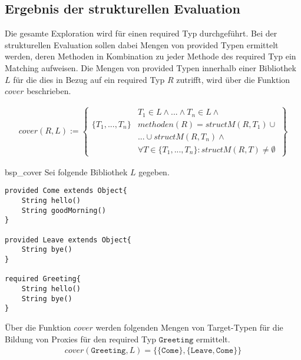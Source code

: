 \subsection{Ergebnis der strukturellen Evaluation}\label{sec_ergStructEval}
Die gesamte Exploration wird für einen required Typ durchgeführt. Bei der strukturellen Evaluation sollen dabei Mengen von provided Typen ermittelt werden, deren Methoden in Kombination zu jeder Methode des required Typ ein Matching aufweisen. Die Mengen von provided Typen innerhalb einer Bibliothek $L$ für die dies in Bezug auf ein required Typ $R$ zutrifft, wird über die Funktion $cover$ beschrieben.

\begin{gather*}
cover(R,L) := 
\left\{\begin{array}{l|l}
					& T_1 \in L \wedge \text{...} \wedge T_n \in L 								\wedge \mathit{ }\\
\{T_1,...,T_n\}		& \mathit{methoden(R)} = \mathit{structM(R,T_1)}							\cup \mathit{ }\\
					& \texttt{...} \cup \mathit{structM(R, T_n)} 								\wedge \mathit{ }\\
					& \forall T \in \{T_1,...,T_n\}:											\mathit{structM(R,T)} \neq \emptyset
\end{array}\right\}
\end{gather*}

\begin{example}{bsp_cover}
Sei folgende Bibliothek $L$ gegeben.
\begin{lstlisting}[style = dsl]
provided Come extends Object{
	String hello()
	String goodMorning()
}

provided Leave extends Object{
	String bye()
}

required Greeting{
	String hello()
	String bye()
}
\end{lstlisting}
Über die Funktion $\mathit{cover}$ werden folgenden Mengen von Target-Typen für die Bildung von Proxies für den required Typ $\texttt{Greeting}$ ermittelt.
\begin{gather*}
\mathit{cover(\texttt{Greeting},L)} = \{
	\{\texttt{Come}\},\{\texttt{Leave}, \texttt{Come}\}
\}
\end{gather*}
\end{example}

